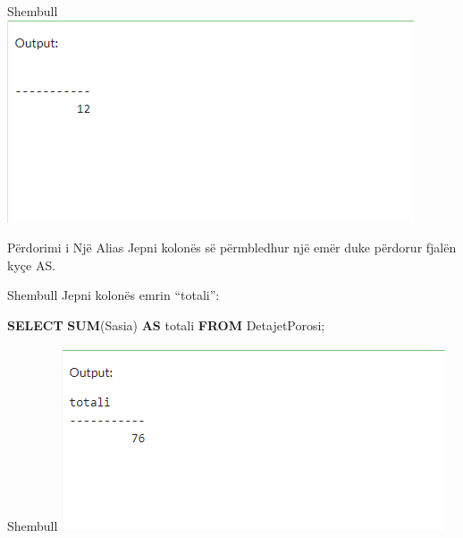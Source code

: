 \documentclass[
  ignorenonframetext,
]{beamer}
\newenvironment{Shaded}{\begin{snugshade}}{\end{snugshade}}
\newcommand{\FunctionTok}[1]{\textcolor[rgb]{0.13,0.29,0.53}{\textbf{#1}}}
\newcommand{\KeywordTok}[1]{\textcolor[rgb]{0.13,0.29,0.53}{\textbf{#1}}}
\newcommand{\NormalTok}[1]{#1}
\begin{document}
\begin{frame}{Shembull}
\label{shembull-38}
\includegraphics{./Figs/query51.png}
\end{frame}

\begin{frame}{Përdorimi i Një Alias}
\label{puxebrdorimi-i-njuxeb-alias-1}
Jepni kolonës së përmbledhur një emër duke përdorur fjalën kyçe AS.
\end{frame}

\begin{frame}[fragile]{Shembull}
\label{shembull-39}
Jepni kolonës emrin ``totali'':


\begin{Shaded}
\begin{Highlighting}[]
\KeywordTok{SELECT} \FunctionTok{SUM}\NormalTok{(Sasia) }\KeywordTok{AS}\NormalTok{ totali}
\KeywordTok{FROM}\NormalTok{ DetajetPorosi;}
\end{Highlighting}
\end{Shaded}
\end{frame}

\begin{frame}{Shembull}
\label{shembull-40}
\includegraphics{./Figs/query52.png}
\end{frame}
\end{document}
